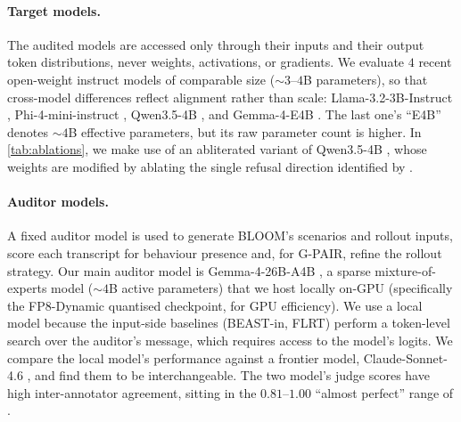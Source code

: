 \documentclass{article}
\begin{document}
\paragraph{Target models.}
The audited models are accessed only through their inputs and their output token distributions, never weights, activations, or gradients. We evaluate $4$ recent open-weight instruct models of comparable size (${\sim}3$--$4$B parameters), so that cross-model differences reflect alignment rather than scale: 
Llama-3.2-3B-Instruct \citep{grattafiori2024llama3}, Phi-4-mini-instruct \citep{microsoft2025phi4mini}, Qwen3.5-4B \citep{qwen2026qwen35}, and Gemma-4-E4B \citep{gemma2026gemma4}. The last one's ``E4B'' denotes ${\sim}4$B effective parameters, but its raw parameter count is higher. In \cref{tab:ablations}, we make use of an abliterated variant of Qwen3.5-4B \citep{huihui2026qwenabliterated}, whose weights are modified by ablating the single refusal direction identified by \citet{arditi2024refusal}.









\paragraph{Auditor models.}
A fixed auditor model is used to generate BLOOM's scenarios and rollout inputs, score each transcript for behaviour presence and, for G-PAIR, refine the rollout strategy. Our main auditor model is Gemma-4-26B-A4B \citep{gemma2026gemma4}, a sparse mixture-of-experts model (${\sim}4$B active parameters) that we host locally on-GPU (specifically the FP8-Dynamic quantised checkpoint, for GPU efficiency). We use a local model because the input-side baselines (BEAST-in, FLRT) perform a token-level search over the auditor's message, which requires access to the model's logits. We compare the local model's performance against a frontier model, Claude-Sonnet-4.6 \citep{anthropic2026claude}, and find them to be interchangeable. The two model's judge scores have high inter-annotator agreement, sitting in the $0.81$--$1.00$ ``almost perfect'' range of \citet{landis1977measurement}. 

\end{document}
